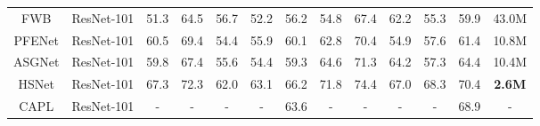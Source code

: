 \documentclass[lettersize,journal]{IEEEtran}
\begin{document}
\begin{table*}
\begin{tabular}{c|c|ccccc|ccccc|c}
\hline
FWB \cite{RN82}                     & ResNet-101                & 51.3                                        & 64.5                                        & 56.7                                        & 52.2                               & 56.2          & 54.8                                        & 67.4                                        & 62.2                                        & 55.3                               & 59.9                      & 43.0M                                                                          \\
PFENet \cite{RN6}                  & ResNet-101                & 60.5                                        & 69.4                                        & 54.4                                        & 55.9                               & 60.1          & 62.8                                        & 70.4                                        & 54.9                                        & 57.6                               & 61.4                      & 10.8M                                                                          \\
ASGNet  \cite{RN9}                  & ResNet-101                & 59.8                                        & 67.4                                        & 55.6                                        & 54.4                               & 59.3          & 64.6                                        & 71.3                                        & 64.2                                        & 57.3                               & 64.4                      & 10.4M                                                                          \\
HSNet \cite{RN85}                    & ResNet-101                & 67.3                                        & 72.3                                        & 62.0                                        & 63.1                      & 66.2          & 71.8                                        & 74.4                                        & 67.0                                        & 68.3                      & 70.4                      & \textbf{2.6M}                                                                  \\
CAPL \cite{RN64}                     & ResNet-101                & -                                           & -                                           & -                                           & -                                  & 63.6          & -                                           & -                                           & -                                           & -                                  & 68.9                      & -                                                                              \\ 

\end{tabular}
\end{table*}
\end{document}
